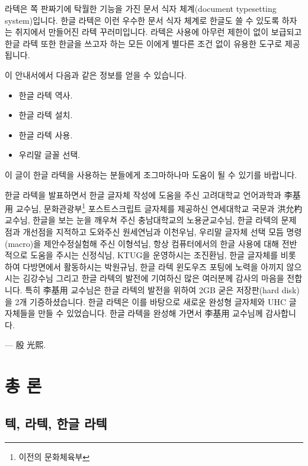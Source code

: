 \begin{acknowledgement}
  라텍은 쪽 판짜기에 탁월한 기능을 가진 문서 식자 체계(document
  typesetting sys\-tem)입니다.  한글 라텍은 이런 우수한 문서 식자
  체계로 한글도 쓸 수 있도록 하자는 취지에서 만들어진 라텍
  꾸러미입니다.  라텍은 사용에 아무런 제한이 없이 보급되고
  한글 라텍 또한 한글을 쓰고자 하는 모든 이에게 별다른 조건 없이
  유용한 도구로 제공됩니다.

  이 안내서에서 다음과 같은 정보를 얻을 수 있습니다.
  \begin{itemize}
  \item 한글 라텍 역사.
  \item 한글 라텍 설치.
  \item 한글 라텍 사용.
  \item 우리말 글꼴 선택.
  \end{itemize}

  이 글이 한글 라텍을 사용하는 분들에게 조그마하나마 도움이 될 수 있기를
  바랍니다.

  한글 라텍을 발표하면서 한글 글자체 작성에 도움을 주신 고려대학교
  언어과학과 李基用 교수님,
  문화관광부\footnote{이전의 문화체육부} 포스트스크립트 글자체를 제공하신
  연세대학교 국문과 洪允杓 교수님, 한글을 보는 눈을 깨우쳐 주신
  충남대학교의 노용균교수님,
  한글 라텍의 문제점과 개선점을 지적하고 도와주신
  원세연님과
  이천우님, 우리말 글자체 선택 모듬
  명령(macro)을 제안\cntrdot 수정\cntrdot 실험해 주신
  이형석님, 항상 컴퓨터에서의 한글
  사용에 대해 전반적으로 도움을 주시는
  신정식님, KTUG을 운영하시는
  조진환님, 한글 글자체를 비롯하여
  다방면에서 활동하시는 박원규님,
  한글 라텍 윈도우즈 포팅에 노력을 아끼지 않으시는
  김강수님 그리고 한글 라텍의 발전에
  기여하신 많은 여러분께 감사의 마음을 전합니다.  특히 李基用 교수님은
  한글 라텍의 발전을 위하여 2GB 굳은 저장판(hard disk)을 2개
  기증하셨습니다.  한글 라텍은 이를 바탕으로 새로운 완성형 글자체와 UHC
  글자체들을 만들 수 있었습니다.  한글 라텍을 완성해 가면서 李基用
  교수님께 감사합니다.

\bigskip

\hfill --- 殷 光熙.
\end{acknowledgement}

\clearpage
\tableofcontents

\part[총론]{총 론}

\chapter{텍, 라텍, 한글 라텍}



